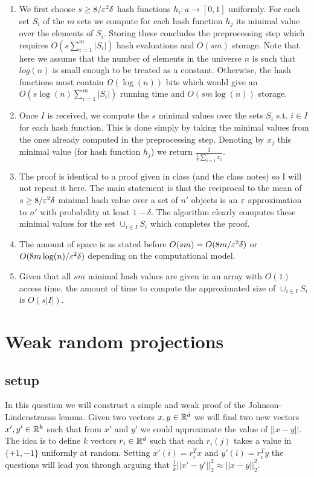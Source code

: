 \begin{enumerate}
\item We first choose $s \ge 8/\varepsilon^2\delta$ hash functions $h_i : a \rightarrow [0,1]$ uniformly.
For each set $S_i$ of the $m$ sets we compute for each hash function $h_j$ its minimal value over the elements of $S_i$.
Storing these concludes the preprocessing step which requires $O(s\sum_{i=1}^{m}|S_i|)$ hash evaluations and $O(sm)$ storage.
Note that here we assume that the number of elements in the universe $n$ is such that $log(n)$ is small enough to be treated as a constant.
Otherwise, the hash functions must contain $\Omega(\log(n))$ bits which would give an $O(s\log(n)\sum_{i=1}^{m}|S_i|)$ running time
and $O(sm\log(n))$ storage.

\item Once $I$ is received, we compute the $s$ minimal values over the sets $S_i$ s.t. $i \in I$ for each hash function.
This is done simply by taking the minimal values from the ones already computed in the preprocessing step. 
Denoting by $x_j$ this minimal value (for hash function $h_j$) we return $\frac{1}{\frac{1}{s}\sum_{i=1}^{s}x_i}$.
\item The proof is identical to a proof given in class (and the class notes) so I will not repeat it here.
The main statement is that the reciprocal to the mean of $s \ge 8/\varepsilon^2\delta$ minimal hash value over a set of $n'$ objects is
an $\varepsilon$ approximation to $n'$ with probability at least $1-\delta$.
The algorithm clearly computes these minimal values for the set $\cup_{i \in I}S_i$ which completes the proof.    
\item The amount of space is as stated before $O(sm) = O(8m/\varepsilon^2\delta)$ or $O(8m\log(n)/\varepsilon^2\delta)$ depending
on the computational model.
\item Given that all $sm$ minimal hash values are given in an array with $O(1)$ access time, the amount of time
to compute the approximated size of $\cup_{i \in I}S_i$ is $O(s|I|)$.
\end{enumerate}

\pagebreak


\section{Weak random projections}
\subsection*{setup}
In this question we will construct a simple and weak proof of the Johnson-Lindenstrauss lemma. 
Given two vectors $x,y \in{\mathbb{R}}^{d}$ we will find two new vectors $x',y'\in {\mathbb{R}}^{k}$ such that from $x'$ and
$y'$ we could approximate the value of $||x-y||$. The idea is to
define $k$ vectors $r_i \in {\mathbb{R}}^{d}$ such that each $r_i(j)$ takes a
value in $\{+1,-1\}$ uniformly at random. Setting $x'(i) =
r_{i}^{T}x$ and $y'(i) = r_{i}^{T}y$ the questions will lead you through arguing that
$\frac{1}{k}||x' -y'||_{2}^{2} \approx ||x-y||_{2}^{2}$.

